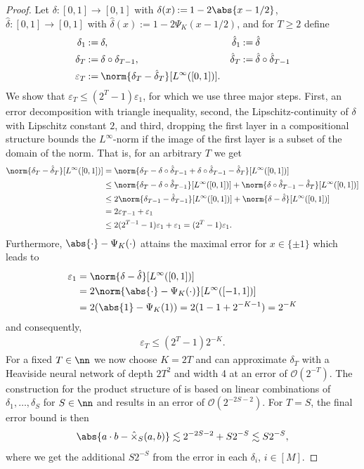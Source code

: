 \documentclass[twoside,11pt]{article}
\newcommand{\defeq}{\mathbin{:=}}
\begin{document}
\begin{proof}
Let $\delta:[0,1]\to[0,1]$ with $\delta(x)\defeq 1-2\abs{x-1/2}$, $\hat{\delta}:[0,1]\to[0,1]$ with $\hat{\delta}(x)\defeq 1-2\Psi_K(x-1/2)$, and for $T \geq 2$ define
\begin{alignat}{2}
    \delta_1&\defeq \delta,&\hat{\delta}_1&\defeq \hat{\delta}\\
    \delta_T&\defeq \delta\circ\delta_{T-1},&\hat{\delta}_T&\defeq \hat{\delta}\circ\hat{\delta}_{T-1}\\
    \varepsilon_T&\defeq \norm{\delta_T-\hat{\delta}_T}[L^\infty([0,1])].
\end{alignat}
We show that $\varepsilon_T\leq (2^T-1)\varepsilon_1$, for which we use three major steps.
First, an error decomposition with triangle inequality,
second, the Lipschitz-continuity of $\delta$ with Lipschitz constant $2$,
and third, dropping the first layer in a compositional structure bounds the $L^\infty$-norm if the image of the first layer is a subset of the domain of the norm.
That is, for an arbitrary $T$ we get
\begin{align}
    \norm{\delta_T-\hat{\delta}_T}[L^\infty([0,1])]
    &=
    \norm{\delta_{T}-\delta\circ\hat{\delta}_{T-1}+\delta\circ\hat{\delta}_{T-1}-\hat{\delta}_{T}}[L^\infty([0,1])]
    \\&
    \leq
    \norm{\delta_{T}-\delta\circ\hat{\delta}_{T-1}}[L^\infty([0,1])]
    +
    \norm{\delta\circ\hat{\delta}_{T-1}-\hat{\delta}_{T}}[L^\infty([0,1])]
    \\&
    \leq
    2\norm{\delta_{T-1}-\hat{\delta}_{T-1}}[L^\infty([0,1])]
    +
    \norm{\delta-\hat{\delta}}[L^\infty([0,1])]
    \\&
    =
    2\varepsilon_{T-1}
    +
    \varepsilon_1
    \\&
    \leq
    2(2^{T-1}-1)\varepsilon_1+\varepsilon_1
    =
    (2^T-1)\varepsilon_1.
\end{align}
Furthermore, $\abs{\cdot}-\Psi_K(\cdot)$ attains the maximal error for $x\in\{\pm 1\}$ which leads to
\begin{align}
    \varepsilon_1
    &=
    \norm{\delta-\hat{\delta}}[L^\infty([0,1])]
    \\&
    =
    2\norm{\abs{\cdot}-\Psi_K(\cdot)}[L^\infty([-1,1])]
    \\&
    =
    2(\abs{1}-\Psi_K(1))
    =
    2(1-1+2^{-K-1})
    =
    2^{-K}
\end{align}
and consequently,
\begin{align}
    \varepsilon_T\leq(2^T-1)2^{-K}.
\end{align}
For a fixed $T\in\nn$ we now choose $K=2T$ and can approximate $\delta_T$ with a Heaviside neural network of depth $2T^2$ and width 4 at an error of $\mathcal{O}(2^{-T})$.
The construction for the product structure of \cite{Yarotsky17ErrorBoundsApproximations} is based on linear combinations of $\delta_1,\ldots,\delta_S$ for $S\in\nn$ and results in an error of $\mathcal{O}(2^{-2S-2})$.
For $T=S$, the final error bound is then 
\begin{align}
    \abs{a\cdot b-\hat{\times}_S(a,b)}
    \lesssim 2^{-2S-2}+S2^{-S}
    \lesssim S2^{-S},
\end{align}
where we get the additional $S2^{-S}$ from the error in each $\delta_i,\,i\in[M]$.


\end{proof}
\end{document}

